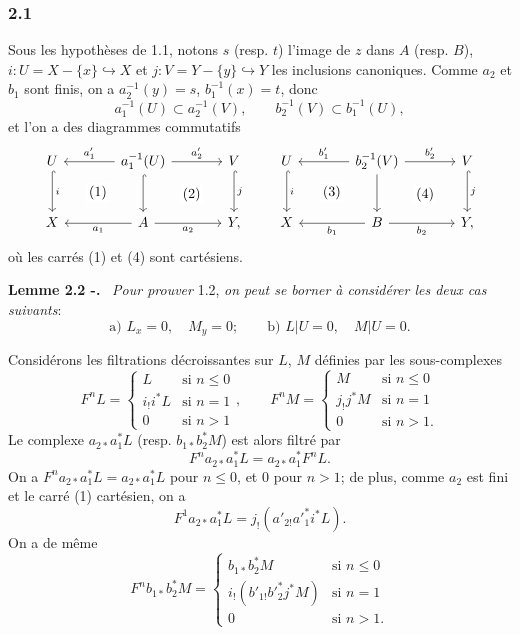 \documentclass[11pt]{article}
\newenvironment{statement}[1]{\par\medskip\noindent\textbf{#1.}\ }{\par\medskip}
\begin{document}
\subsubsection*{2.1}
Sous les hypothèses de 1.1, notons $s$ (resp. $t$) l'image de $z$ dans $A$ (resp. $B$), $i:U=X-\{x\}\hookrightarrow X$ et $j:V=Y-\{y\}\hookrightarrow Y$ les inclusions canoniques. Comme $a_2$ et $b_1$ sont finis, on a $a_2^{-1}(y)=s$, $b_1^{-1}(x)=t$, donc
\[
a_1^{-1}(U)\subset a_2^{-1}(V),\qquad b_2^{-1}(V)\subset b_1^{-1}(U),
\]
et l'on a des diagrammes commutatifs
\[
\begin{tikzcd}[column sep=large,row sep=large]
U \arrow[d,hook,"i"] \arrow[rd,phantom,"(1)"{description}] & a_1^{-1}(U) \arrow[l,"a'_1"'] \arrow[r,"a'_2"] \arrow[d,hook] \arrow[rd,phantom,"(2)"{description}] & V \arrow[d,hook,"j"]\\
X & A \arrow[l,"a_1"] \arrow[r,"a_2"'] & Y ,
\end{tikzcd}
\qquad
\begin{tikzcd}[column sep=large,row sep=large]
U \arrow[d,hook,"i"] \arrow[rd,phantom,"(3)"{description}] & b_2^{-1}(V) \arrow[l,"b'_1"'] \arrow[r,"b'_2"] \arrow[d] \arrow[rd,phantom,"(4)"{description}] & V \arrow[d,hook,"j"]\\
X & B \arrow[l,"b_1"] \arrow[r,"b_2"'] & Y ,
\end{tikzcd}
\]
où les carrés (1) et (4) sont cartésiens.

\begin{statement}{Lemme 2.2 -}
\emph{Pour prouver} 1.2, \emph{on peut se borner à considérer les deux cas suivants}:
\[
\text{a) } L_x=0,\quad M_y=0;\qquad
\text{b) } L|U=0,\quad M|U=0 .
\]
\end{statement}

Considérons les filtrations décroissantes sur $L$, $M$ définies par les sous-complexes
\[
F^nL=
\begin{cases}
L & \text{si } n\le 0\\
i_!i^*L & \text{si } n=1\\
0 & \text{si } n>1
\end{cases}
,\qquad
F^nM=
\begin{cases}
M & \text{si } n\le 0\\
j_!j^*M & \text{si } n=1\\
0 & \text{si } n>1.
\end{cases}
\]
Le complexe $a_{2*}a_1^*L$ (resp. $b_{1*}b_2^*M$) est alors filtré par
\[
F^n a_{2*}a_1^*L=a_{2*}a_1^*F^nL.
\]
On a $F^n a_{2*}a_1^*L=a_{2*}a_1^*L$ pour $n\le 0$, et $0$ pour $n>1$; de plus, comme $a_2$ est fini et le carré (1) cartésien, on a
\[
F^1a_{2*}a_1^*L=j_!(a'_{2!}a'^*_1i^*L).
\]
On a de même
\[
F^n b_{1*}b_2^*M=
\begin{cases}
b_{1*}b_2^*M & \text{si } n\le 0\\
i_!(b'_{1!}b'^*_2j^*M) & \text{si } n=1\\
0 & \text{si } n>1.
\end{cases}
\]
\end{document}
